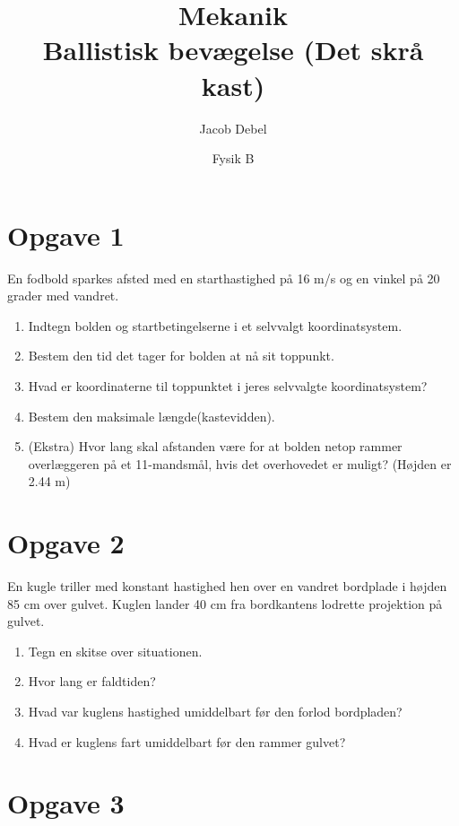 \documentclass[a4paper, 12pt]{article}
\author{Jacob Debel}
\date{Fysik B}
\title{Mekanik\\\medskip
\large Ballistisk bevægelse (Det skrå kast)}
\begin{document}
\maketitle


\section*{Opgave 1}
\label{sec:org375fe2c}

En fodbold sparkes afsted med en starthastighed på 16 m/s og en vinkel på 20 grader med vandret.

\begin{enumerate}
\item Indtegn bolden og startbetingelserne i et selvvalgt koordinatsystem.
\item Bestem den tid det tager for bolden at nå sit toppunkt.
\item Hvad er koordinaterne til toppunktet i jeres selvvalgte koordinatsystem?
\item Bestem den maksimale længde(kastevidden).
\item (Ekstra) Hvor lang skal afstanden være for at bolden netop rammer overlæggeren på et 11-mandsmål, hvis det overhovedet er muligt? (Højden er 2.44 m)
\end{enumerate}

\section*{Opgave 2}
\label{sec:org4987828}

En kugle triller med konstant hastighed hen over en vandret bordplade i højden 85 cm over gulvet. Kuglen lander 40 cm fra bordkantens lodrette projektion på gulvet.

\begin{enumerate}
\item Tegn en skitse over situationen.
\item Hvor lang er faldtiden?
\item Hvad var kuglens hastighed umiddelbart før den forlod bordpladen?
\item Hvad er kuglens fart umiddelbart før den rammer gulvet?
\end{enumerate}

\newpage

\section*{Opgave 3}
\label{sec:orgdadba21}
\end{document}
